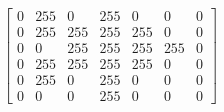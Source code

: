 \begin{itemize}
\begin{itemize}
\begin{align*}
\begin{bmatrix}
                                0 & 255 & 0 & 255 & 0 & 0 & 0 \\
                                0 & 255 & 255 & 255 & 255 & 0 & 0 \\
                                0 & 0 & 255 & 255 & 255 & 255 & 0 \\
                                0 & 255 & 255 & 255 & 255 & 0 & 0 \\
                                0 & 255 & 0 & 255 & 0 & 0 & 0 \\
                                0 & 0 & 0 & 255 & 0 & 0 & 0
                                \end{bmatrix}
                            \end{align*}
                    \end{itemize}
            \end{itemize}
